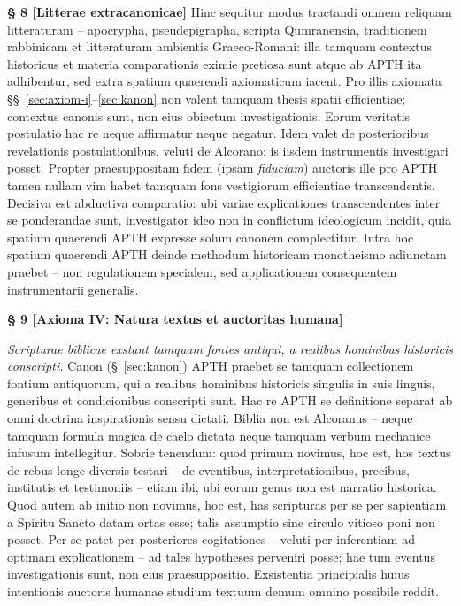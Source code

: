 \documentclass[11pt,a4paper]{article}
\makeatletter
\newcommand{\apth}{{\apthfont APTH}\hspace{0.15em}\xspace}
\newcommand{\apthsec}[3]{%
  \phantomsection%
  \def\@currentlabel{#1}%
  \label{sec:#3}%
  \textbf{§ #1 [#2]}%
}
\makeatother
\begin{document}
\apthsec{8}{Litterae extracanonicae}{ausserkanonisch} Hinc sequitur modus tractandi omnem reliquam litteraturam -- apocrypha, pseudepigrapha, scripta Qumranensia, traditionem rabbinicam et litteraturam ambientis Graeco-Romani: illa tamquam contextus historicus et materia comparationis eximie pretiosa sunt atque ab \apth ita adhibentur, sed extra spatium quaerendi axiomaticum iacent. Pro illis axiomata §§~\ref{sec:axiom-i}--\ref{sec:kanon} non valent tamquam thesis spatii efficientiae; contextus canonis sunt, non eius obiectum investigationis. Eorum veritatis postulatio hac re neque affirmatur neque negatur. Idem valet de posterioribus revelationis postulationibus, veluti de Alcorano: is iisdem instrumentis investigari posset. Propter praesuppositam fidem (ipsam \textit{fiduciam}) auctoris ille pro \apth tamen nullam vim habet tamquam fons vestigiorum efficientiae transcendentis. Decisiva est abductiva comparatio: ubi variae explicationes transcendentes inter se ponderandae sunt, investigator ideo non in conflictum ideologicum incidit, quia spatium quaerendi \apth expresse solum canonem complectitur. Intra hoc spatium quaerendi \apth deinde methodum historicam monotheismo adiunctam praebet -- non regulationem specialem, sed applicationem consequentem instrumentarii generalis.

\apthsec{9}{Axioma IV: Natura textus et auctoritas humana}{textnatur}
\textit{Scripturae biblicae exstant tamquam fontes antiqui, a realibus hominibus historicis conscripti.}
Canon (§~\ref{sec:kanon}) \apth praebet se tamquam collectionem fontium antiquorum, qui a realibus hominibus historicis singulis in suis linguis, generibus et condicionibus conscripti sunt. Hac re \apth se definitione separat ab omni doctrina inspirationis sensu dictati: Biblia non est Alcoranus -- neque tamquam formula magica de caelo dictata neque tamquam verbum mechanice infusum intellegitur. Sobrie tenendum: quod primum novimus, hoc est, hos textus de rebus longe diversis testari -- de eventibus, interpretationibus, precibus, institutis et testimoniis -- etiam ibi, ubi eorum genus non est narratio historica. Quod autem ab initio non novimus, hoc est, has scripturas per se per sapientiam a Spiritu Sancto datam ortas esse; talis assumptio sine circulo vitioso poni non posset. Per se patet per posteriores cogitationes -- veluti per inferentiam ad optimam explicationem -- ad tales hypotheses perveniri posse; hae tum eventus investigationis sunt, non eius praesuppositio. Exsistentia principialis huius intentionis auctoris humanae studium textuum demum omnino possibile reddit.
\end{document}
